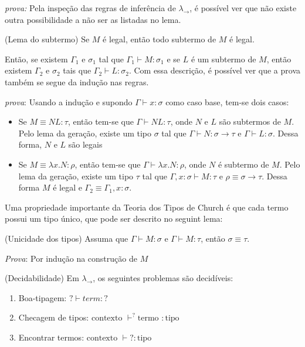 \documentclass[../main.tex]{subfiles}
\begin{document}
\emph{prova:} Pela inspeção das regras de inferência de $\lambda_{\rightarrow}$, é possível ver que não existe outra possibilidade a não ser as listadas no lema.

\begin{lemma}(Lema do subtermo)
    Se $M$ é legal, então todo subtermo de $M$ é legal.
\end{lemma}

Então, se existem $\Gamma_1$ e $\sigma_1$ tal que $\Gamma_1 \vdash M : \sigma_1$ e se $L$ é um subtermo de $M$, então existem $\Gamma_2$ e $\sigma_2$ tais que $\Gamma_2 \vdash L : \sigma_2$. Com essa descrição, é possível ver que a prova também se segue da indução nas regras.

\emph{prova}: Usando a indução e supondo $\Gamma \vdash x : \sigma$ como caso base, tem-se dois casos:

\begin{itemize}
    \item Se $M \equiv NL : \tau$, então tem-se que $\Gamma \vdash NL : \tau$, onde $N$ e $L$ são subtermos de $M$. Pelo lema da geração, existe um tipo $\sigma$ tal que $\Gamma \vdash N : \sigma \to \tau$ e $\Gamma \vdash L : \sigma $. Dessa forma, $N$ e $L$ são legais
    \item Se $M \equiv \lambda x . N : \rho$, então tem-se que $\Gamma \vdash  \lambda x . N : \rho$, onde $N$ é subtermo de $M$. Pelo lema da geração, existe um tipo $\tau$ tal que $\Gamma, x : \sigma \vdash M : \tau$ e $\rho \equiv \sigma \to \tau$. Dessa forma $M$ é legal e $\Gamma_2 \equiv \Gamma_1, x : \sigma$.
\end{itemize}

Uma propriedade importante da Teoria dos Tipos de Church é que cada termo possui um tipo único, que pode ser descrito no seguint lema:

\begin{lemma}(Unicidade dos tipos)
    Assuma que $\Gamma \vdash M : \sigma$ e $\Gamma \vdash M : \tau$, então $\sigma \equiv \tau$.
\end{lemma}

\emph{Prova}: Por indução na construção de $M$

\begin{theorem}(Decidabilidade)
    Em $\lambda_{\rightarrow}$, os seguintes problemas são decidíveis:
    \begin{enumerate}
        \item Boa-tipagem: $? \vdash term : ?$
        \item Checagem de tipos: $\text{contexto } \vdash^{?} \text{termo } : \text{tipo}$
        \item Encontrar termos: $\text{contexto } \vdash \text{?} : \text{tipo}$
    \end{enumerate}
\end{theorem}
\end{document}
